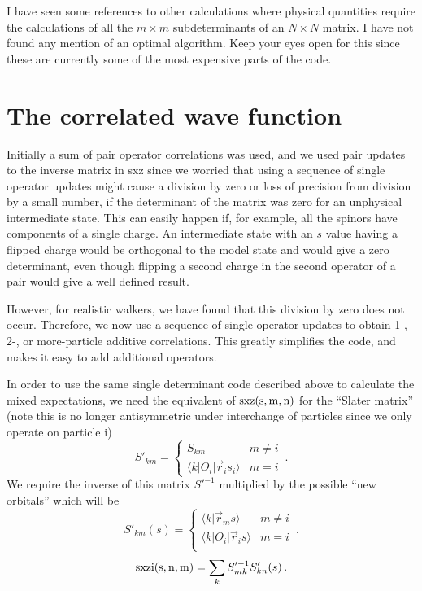 \documentclass[12pt]{article}
\begin{document}
I have seen some references to other calculations where physical quantities
require the calculations of all the $m\times m$ subdeterminants
of an $N \times N$ matrix. I have not found any mention of an
optimal algorithm. Keep your eyes open for this since these are currently
some of the most expensive parts of the code.

\section{The correlated wave function}
Initially a sum of pair operator correlations was used, and we used
pair updates to the inverse matrix in sxz since we worried that
using a sequence of single operator updates might cause a division
by zero or loss of precision from division by a small number,
if the determinant of the matrix was zero for an unphysical
intermediate state. This can easily happen if, for example, all the spinors
have components of a single charge. An intermediate state with an $s$ value
having a flipped charge
would be orthogonal to the model state and would give
a zero determinant, even though flipping a second charge in the second
operator of a pair would give a well defined result.

However, for realistic walkers, we have found that this division by
zero does not occur. Therefore, we now use a sequence of single operator
updates to obtain 1-, 2-, or more-particle additive correlations.
This greatly simplifies the code, and makes it easy to add additional
operators.

In order to use the same single determinant 
code described above to calculate the mixed expectations,
we need the equivalent of
${\rm sxz(s,m,n)}$ for the ``Slater matrix'' (note this is no longer
antisymmetric under interchange of particles since we only operate
on particle i)
\begin{equation}
S'_{km} = \left \{
\begin{array}{cc}
S_{km} & m \neq i\\
\langle k|O_i|\vec r_i s_i\rangle & m = i
\end{array}
\right . \,.
\end{equation}
We require the inverse of this matrix $S'^{-1}$ multiplied by the
possible ``new orbitals'' which will be
\begin{equation}
\label{eq6}
S'_{km}(s)= \left \{
\begin{array}{cc}
\langle k|\vec r_m s\rangle & m\neq i\\
\langle k|O_i|\vec r_i s\rangle &  m=i\\
\end{array}
\right . \,.
\end{equation}
\begin{equation}
{\rm sxzi(s,n,m)}=\sum_k S'^{-1}_{mk} S'_{kn}(s) \,.
\end{equation}
\end{document}
